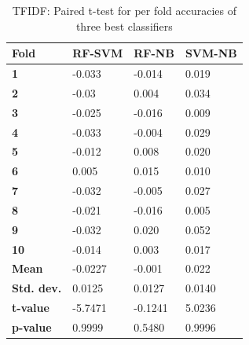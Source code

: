 \documentclass{article}
\begin{document}
\begin{table}[H]
\begin{tabular}{llll}
\textbf{Fold}      & \textbf{RF-SVM} & \textbf{RF-NB} & \textbf{SVM-NB} \\ \hline
\textbf{1}         & -0.033          & -0.014         & 0.019           \\
\textbf{2}         & -0.03           & 0.004          & 0.034           \\
\textbf{3}         & -0.025          & -0.016         & 0.009           \\
\textbf{4}         & -0.033          & -0.004         & 0.029           \\
\textbf{5}         & -0.012          & 0.008          & 0.020           \\
\textbf{6}         & 0.005           & 0.015          & 0.010           \\
\textbf{7}         & -0.032          & -0.005         & 0.027           \\
\textbf{8}         & -0.021          & -0.016         & 0.005           \\
\textbf{9}         & -0.032          & 0.020          & 0.052           \\
\textbf{10}        & -0.014          & 0.003          & 0.017           \\ \hline
\textbf{Mean}      & -0.0227         & -0.001         & 0.022           \\ \hline
\textbf{Std. dev.} & 0.0125          & 0.0127         & 0.0140          \\ \hline
\textbf{t-value}   & -5.7471         & -0.1241        & 5.0236          \\ \hline
\textbf{p-value}   & 0.9999          & 0.5480         & 0.9996         
\end{tabular}
\caption{TFIDF: Paired t-test for per fold accuracies of three best classifiers}
\end{table}

\clearpage
\end{document}
